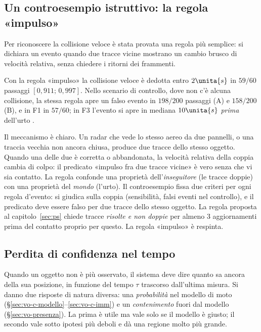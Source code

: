 \subsection{Un controesempio istruttivo: la regola «impulso»}\label{sec:vo-impulso}

Per riconoscere la collisione veloce è stata provata una regola più semplice: si dichiara un evento quando due tracce vicine mostrano un cambio brusco di velocità relativa, senza chiedere i ritorni dei frammenti.

\begin{controesempio}\label{ce:vo-impulso}
Con la regola «impulso» la collisione veloce è dedotta entro $2\unita{s}$ in $59/60$ passaggi $[0{,}911;\,0{,}997]$. Nello scenario di controllo, dove non c'è alcuna collisione, la stessa regola apre un falso evento in $198/200$ passaggi (A) e $158/200$ (B), e in F1 in $57/60$; in F3 l'evento si apre in mediana $10\unita{s}$ \emph{prima} dell'urto .
\end{controesempio}
Il meccanismo è chiaro. Un radar che vede lo stesso aereo da due pannelli, o una traccia vecchia non ancora chiusa, produce due tracce dello stesso oggetto. Quando una delle due è corretta o abbandonata, la velocità relativa della coppia cambia di colpo: il predicato «impulso fra due tracce vicine» è vero senza che vi sia contatto. La regola confonde una proprietà dell'\emph{inseguitore} (le tracce doppie) con una proprietà del \emph{mondo} (l'urto). Il controesempio fissa due criteri per ogni regola d'evento: si giudica sulla coppia (sensibilità, falsi eventi nel controllo), e il predicato deve essere falso per due tracce dello stesso oggetto. La regola proposta al capitolo~\ref{sec:ps} chiede tracce \emph{risolte e non doppie} per almeno 3 aggiornamenti prima del contatto proprio per questo. La regola «impulso» è respinta.

\subsection{Perdita di confidenza nel tempo}\label{sec:vo-confidenza}

Quando un oggetto non è più osservato, il sistema deve dire quanto sa ancora della sua posizione, in funzione del tempo $\tau$ trascorso dall'ultima misura. Si danno due risposte di natura diversa: una \emph{probabilità} nel modello di moto (\S\ref{sec:vo-c-modello}--\ref{sec:vo-c-imm}) e un \emph{contenimento} fuori dal modello (\S\ref{sec:vo-presenza}). La prima è utile ma vale solo se il modello è giusto; il secondo vale sotto ipotesi più deboli e dà una regione molto più grande.

